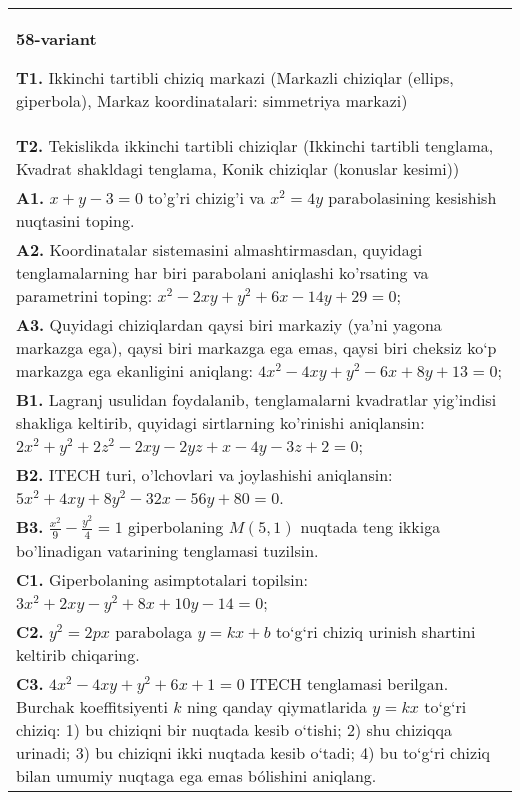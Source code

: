 \documentclass{article}
\begin{document}
\begin{tabular}{m{17cm}}
\textbf{58-variant}
\newline

\textbf{T1.} Ikkinchi tartibli chiziq markazi (Markazli chiziqlar (ellips, giperbola), Markaz koordinatalari: simmetriya markazi) \\
\textbf{T2.} Tekislikda ikkinchi tartibli chiziqlar (Ikkinchi tartibli tenglama, Kvadrat shakldagi tenglama, Konik chiziqlar (konuslar kesimi)) \\
\textbf{A1.} $x+y-3=0$ to'g'ri chizig'i va $x^2=4 y$ parabolasining kesishish nuqtasini toping. \\
\textbf{A2.} Koordinatalar sistemasini almashtirmasdan, quyidagi tenglamalarning har biri parabolani aniqlashi ko'rsating va parametrini toping: $x^2-2 x y+y^2+6 x-14 y+29=0$; \\
\textbf{A3.} Quyidagi chiziqlardan qaysi biri markaziy (ya’ni yagona markazga ega), qaysi biri markazga ega emas, qaysi biri cheksiz ko‘p markazga ega ekanligini aniqlang: $4 x^2-4 x y+y^2-6 x+8 y+13=0$; \\
\textbf{B1.} Lagranj usulidan foydalanib, tenglamalarni kvadratlar yig'indisi shakliga keltirib, quyidagi sirtlarning ko'rinishi aniqlansin: $2 x^2+y^2+2 z^2-2 x y-2 y z+x-4 y-3 z+2=0$; \\
\textbf{B2.} ITECH turi, o'lchovlari va joylashishi aniqlansin: $5 x^2+4 x y+8 y^2-32 x-56 y+80=0$. \\
\textbf{B3.} $\frac{x^2}{9}-\frac{y^2}{4}=1$ giperbolaning $M(5,1)$ nuqtada teng ikkiga bo'linadigan vatarining tenglamasi tuzilsin. \\
\textbf{C1.} Giperbolaning asimptotalari topilsin: $3 x^2+2 x y-y^2+8 x+10 y-14=0$; \\
\textbf{C2.} $y^2=2 p x$ parabolaga $y=k x+b$ to‘g‘ri chiziq urinish shartini keltirib chiqaring. \\
\textbf{C3.} $4 x^2-4 x y+y^2+6 x+1=0$ ITECH tenglamasi berilgan. Burchak koeffitsiyenti $k$ ning qanday qiymatlarida $y=kx$ to‘g‘ri chiziq: 1) bu chiziqni bir nuqtada kesib o‘tishi; 2) shu chiziqqa urinadi; 3) bu chiziqni ikki nuqtada kesib o‘tadi; 4) bu to‘g‘ri chiziq bilan umumiy nuqtaga ega emas bólishini aniqlang. \\

\end{tabular}
\vspace{1cm}
\end{document}
